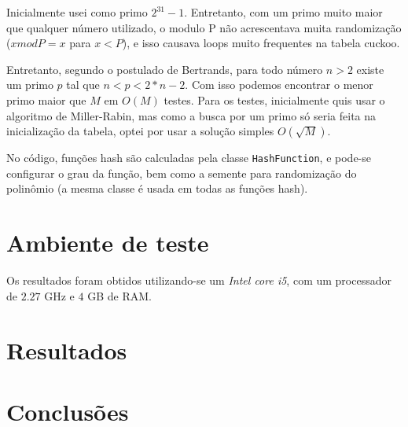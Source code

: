 \documentclass{article}
\begin{document}
Inicialmente usei como primo $2^{31} - 1$. Entretanto, com um primo muito maior que qualquer número
utilizado, o modulo P não acrescentava muita randomização ($ x mod P = x$ para $x < P$), e isso
causava loops muito frequentes na tabela cuckoo.

Entretanto, segundo o postulado de Bertrands, para todo número $n > 2$ existe um primo $p$ tal que
$n < p < 2 * n - 2$. Com isso podemos encontrar o menor primo maior que $M$ em $O(M)$ testes. Para
os testes, inicialmente quis usar o algoritmo de Miller-Rabin, mas como a busca por um primo só
seria feita na inicialização da tabela, optei por usar a solução simples $O(\sqrt{M})$.

No código, funções hash são calculadas pela classe \texttt{HashFunction}, e pode-se configurar o
grau da função, bem como a semente para randomização do polinômio (a mesma classe é usada em todas
as funções hash).

\section{Ambiente de teste}

Os resultados foram obtidos utilizando-se um \emph{Intel core i5}, com um processador de $2.27$ GHz
e $4$ GB de RAM.

\section{Resultados}

\section{Conclusões}
\end{document}

